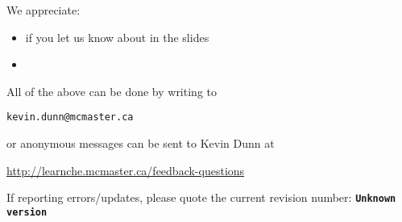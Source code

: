 \documentclass[handout, 11pt]{beamer}
\newcommand{\hgversion}{Unknown version}
\begin{document}
\begin{frame}\frametitle{}
	We appreciate:
	\begin{itemize}
		\item	if you let us know about {} in the slides
		\item	{}
	\end{itemize}
	\vskip24pt
	
	\begin{exampleblock}{}
		All of the above can be done by writing to
		\begin{center}
			{\Large \tt kevin.dunn@mcmaster.ca}
		\end{center}
		or anonymous messages can be sent to Kevin Dunn at
		\begin{center}
			{\Large \href{http://learnche.mcmaster.ca/feedback-questions}{http://learnche.mcmaster.ca/feedback-questions}}
		\end{center}
	\end{exampleblock}
	\vskip12pt
	{\scriptsize If reporting errors/updates, please quote the current revision number: \textbf{\tt \hgversion}}
\end{frame}


\end{document}
